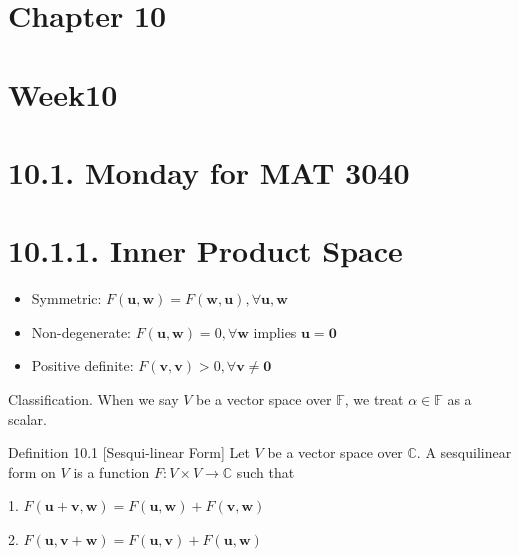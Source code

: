 \documentclass[11pt]{article}
\begin{document}
\section*{Chapter 10}

\section*{Week10}

\section*{10.1. Monday for MAT 3040}

\section*{10.1.1. Inner Product Space}

\begin{itemize}
\item Symmetric: \(F\left( {\mathbf{u},\mathbf{w}}\right)  = F\left( {\mathbf{w},\mathbf{u}}\right) ,\forall \mathbf{u},\mathbf{w}\)
\end{itemize}

\begin{itemize}
\item Non-degenerate: \(F\left( {\mathbf{u},\mathbf{w}}\right)  = 0,\forall \mathbf{w}\) implies \(\mathbf{u} = \mathbf{0}\)
\end{itemize}

\begin{itemize}
\item Positive definite: \(F\left( {\mathbf{v},\mathbf{v}}\right)  > 0,\forall \mathbf{v} \neq  \mathbf{0}\)
\end{itemize}

Classification. When we say \(V\) be a vector space over \(\mathbb{F}\), we treat \(\alpha  \in  \mathbb{F}\) as a scalar.

Definition 10.1 [Sesqui-linear Form] Let \(V\) be a vector space over \(\mathbb{C}\). A sesquilinear form on \(V\) is a function \(F : V \times  V \rightarrow  \mathbb{C}\) such that

1. \(F\left( {\mathbf{u} + \mathbf{v},\mathbf{w}}\right)  = F\left( {\mathbf{u},\mathbf{w}}\right)  + F\left( {\mathbf{v},\mathbf{w}}\right)\)

2. \(F\left( {\mathbf{u},\mathbf{v} + \mathbf{w}}\right)  = F\left( {\mathbf{u},\mathbf{v}}\right)  + F\left( {\mathbf{u},\mathbf{w}}\right)\)
\end{document}
